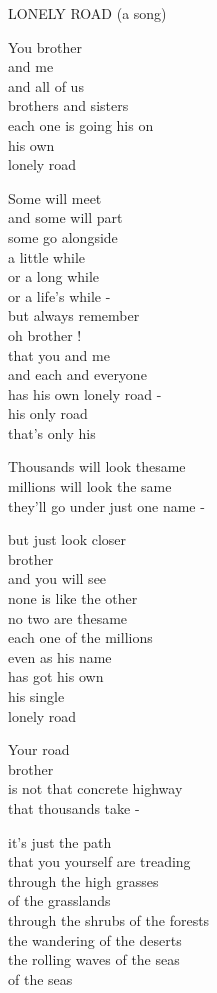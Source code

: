 \begin{center}
LONELY ROAD \qquad (a song)
\end{center}
\noindent\begin{minipage}[t]{.48\linewidth}\small\raggedright
You \enspace brother\\
and me\\
and all of us\\
brothers and sisters\\
each one is going his on\\
his own\\
lonely road

\medskip
Some will meet\\
and some will part\\
some go alongside\\
a little while\\
or a long while\\
or a life's while -\\
but always remember\\
oh brother !\\
that you and me\\
and each and everyone\\
has his own lonely road -\\
his only road\\
that's only his

\medskip
Thousands will look thesame\\
millions will look the same\\
they'll go under just one name -

\smallskip
but just look closer\\
brother\\
and you will see\\
none is like the other\\
no two are thesame\\
each one of the millions\\
even as his name\\
has got his own\\
his single\\
lonely road
\end{minipage}\hfill
\begin{minipage}[t]{.48\linewidth}\small\raggedright
Your road\\
brother\\
is not that concrete highway\\
that thousands take -

\smallskip
it's just the path\\
that you yourself are treading\\
through the high grasses\\
of the grasslands\\
through the shrubs of the forests\\
the wandering  of the deserts\\
the rolling waves of the seas\\
of the seas
\end{minipage}\par
